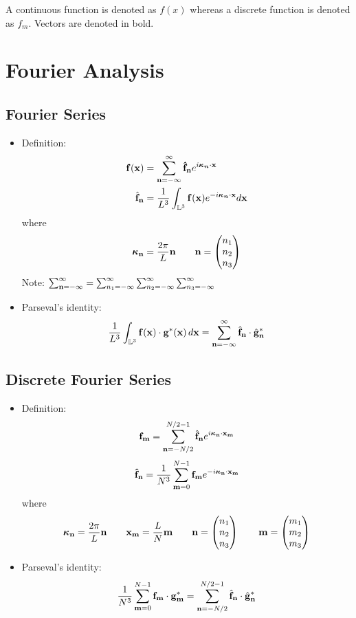 \documentclass[oneside,a4paper,11pt]{article}
\newcommand{\knvec}{\boldsymbol{\kappa_n}}
\newcommand{\fhnvec}{\mathbf{\hat{f}_n}}
\begin{document}
A continuous function is denoted as $f(x)$ whereas a discrete function is denoted as $f_m$. Vectors are denoted in bold.

\section{Fourier Analysis}
\subsection{Fourier Series}
\begin{itemize}
\item Definition:
\begin{align*}
\fvec(\xvec) &= \sum_{\nvec=-\infty}^\infty \fhnvec e^{ i \knvec \cdot \xvec} \\
\hat{\fvec}_\nvec &= \frac{1}{L^3}\int_{\mathbb{L}^3} \fvec(\xvec)e^{-i\knvec \cdot \xvec}d\xvec
\end{align*}
where
\[ \boldsymbol\kappa_{\mathbf{n}} = \frac{2 \pi}{L} \mathbf{n} \qquad \mathbf{n} = \begin{pmatrix} n_1 \\ n_2 \\ n_3 \end{pmatrix}  \]
Note: $ \sum_{\mathbf{n} = -\infty}^{\infty} = \sum_{n_1 = -\infty}^{\infty} \sum_{n_2 = -\infty}^{\infty} \sum_{n_3 = -\infty}^{\infty} $

\item Parseval's identity:
\[ \frac{1}{L^3} \int_{\mathbb{L}^3} \mathbf{f}(\mathbf{x}) \cdot \mathbf{g}^*(\mathbf{x}) \, d\mathbf{x} = \sum_{\mathbf{n} = -\infty}^{\infty} \hat{ \mathbf{f} }_{\mathbf{n}} \cdot \hat{ \mathbf{g} }^*_{\mathbf{n}} \]

\end{itemize}

\subsection{Discrete Fourier Series}
\begin{itemize}
\item Definition:
\[\mathbf{f}_{\mathbf{m}} = \sum_{\mathbf{n}=-N/2}^{N/2-1} \hat{\mathbf{f}}_{\mathbf{n}} e^{i \boldsymbol\kappa_{\mathbf{n}} \cdot \mathbf{x}_{\mathbf{m}}}\]
\[\fhnvec=\frac{1}{N^3}\sum_{\mvec=0}^{N-1} \fvec_\mvec e^{-i \kvec_\nvec \cdot \xvec_\mvec}\]
 where 
 \[ \boldsymbol\kappa_{\mathbf{n}} = \frac{2 \pi}{L} \mathbf{n} \qquad \mathbf{x}_{\mathbf{m}} = \frac{L}{N}\mathbf{m} \qquad \mathbf{n} = \begin{pmatrix} n_1 \\ n_2 \\ n_3 \end{pmatrix} \qquad \mathbf{m} = \begin{pmatrix} m_1 \\ m_2 \\m_3 \end{pmatrix} \]
 
 \item Parseval's identity:
 \[ \frac{1}{N^3} \sum_{\mathbf{m}=0}^{N-1} \mathbf{f}_{\mathbf{m}} \cdot \mathbf{g}^*_{\mathbf{m}} = \sum_{\mathbf{n}=-N/2}^{N/2-1} \hat{ \mathbf{f} }_{\mathbf{n}} \cdot \hat{ \mathbf{g} }^*_{\mathbf{n}} \]
 \end{itemize}
 
\end{document}
